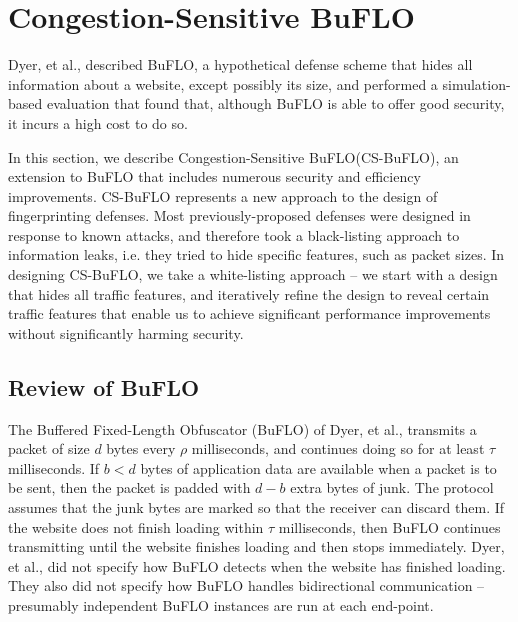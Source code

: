 \documentclass[10pt,journal]{IEEEtran}
\newcommand{\buflo} {BuFLO\xspace}
\newcommand{\csbuflo} {Congestion-Sensitive BuFLO\xspace}
\newcommand{\csb} {CS-BuFLO\xspace}
\begin{document}
\section{\csbuflo}
\label{sec:design}

Dyer, et al., described \buflo, a hypothetical defense scheme that
hides all information about a website, except possibly its size, and
performed a simulation-based evaluation that found that, although
\buflo is able to offer good security, it incurs a high cost to do so.

In this section, we describe \csbuflo (\csb), an extension to \buflo that
includes numerous security and efficiency improvements.  \csb
represents a new approach to the design of fingerprinting defenses.
Most previously-proposed defenses were designed in response to known
attacks, and therefore took a black-listing approach to information
leaks, i.e. they tried to hide specific features, such as packet
sizes.  In designing \csb, we take a white-listing approach -- we
start with a design that hides all traffic features, and iteratively
refine the design to reveal certain traffic features that enable us to
achieve significant performance improvements without significantly
harming security.

\subsection{Review of \buflo}

The Buffered Fixed-Length Obfuscator (\buflo) of Dyer, et al.,
transmits a packet of size $d$ bytes every $\rho$ milliseconds, and
continues doing so for at least $\tau$ milliseconds.  If $b<d$ bytes
of application data are available when a packet is to be sent, then
the packet is padded with $d-b$ extra bytes of junk.  The protocol
assumes that the junk bytes are marked so that the receiver can
discard them.  If the website does not finish loading within $\tau$
milliseconds, then \buflo continues transmitting until the website
finishes loading and then stops immediately.  Dyer, et al., did not
specify how \buflo detects when the website has finished loading.
They also did not specify how \buflo handles bidirectional
communication -- presumably independent \buflo instances are run at
each end-point.
\end{document}
